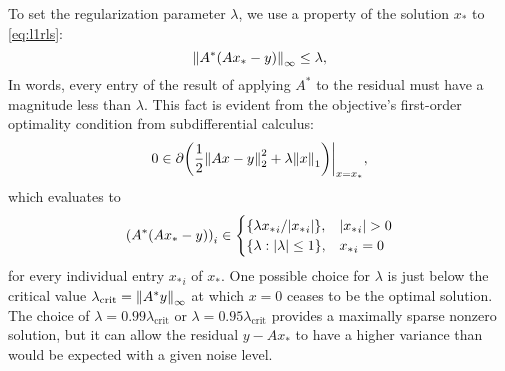 To set the regularization parameter $\lambda$, we use a property of the solution $x_*$ to \eqref{eq:l1rls}:
\begin{equation}\label{eq:optimality_condition}
 \norm{\infty}{A^*\paren*{Ax_* - y}} \le \lambda,
\end{equation}
In words, every entry of the result of applying $A^*$ to the residual must have a magnitude less than $\lambda$. This fact is evident from the objective's first-order optimality condition from subdifferential calculus:
\begin{equation}
 0 \in \partial \paren*{\frac{1}{2}\norm{2}{Ax - y}^2 + \lambda\norm{1}{x}}\bigg|_{x = x_*},
\end{equation}
which evaluates to
\begin{equation}
 \paren*{A^*\paren*{Ax_* - y}}_i \in \begin{cases}
                                      \set{\lambda {x_*}_i/\abs*{{x_*}_i}}, & \abs*{{x_*}_i} > 0\\
                                      \set{\lambda : \abs{\lambda} \le 1}, & {x_*}_i = 0
                                     \end{cases}
\end{equation}
for every individual entry ${x_*}_i$ of $x_*$. One possible choice for $\lambda$ is just below the critical value $\lambda_\text{crit} = \left\lVert A^*y\right\rVert_{\infty}$ at which $x = 0$ ceases to be the optimal solution. The choice of $\lambda = 0.99\lambda_\text{crit}$ or $\lambda = 0.95\lambda_\text{crit}$ provides a maximally sparse nonzero solution, but it can allow the residual $y - Ax_*$ to have a higher variance than would be expected with a given noise level.

